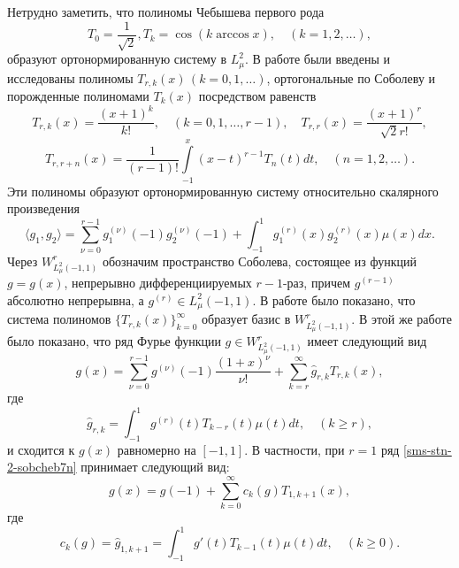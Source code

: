 Нетрудно заметить, что полиномы Чебышева первого рода
$$T_0=\frac{1}{\sqrt{2}},  T_k=\cos{(k\arccos x)}, \quad (k=1,2,\dots),$$
образуют ортонормированную систему в $L_\mu^2$.
В работе \cite{sms-stn-2-SharIzVuz} были введены и исследованы полиномы $T_{r,k}(x)\,(k=0,1,\ldots)$, ортогональные по Соболеву и порожденные полиномами $T_k(x)$ посредством  равенств
\begin{equation}\label{sms-stn-2-sobcheb1}
T_{r,k}(x) =\frac{(x+1)^k}{k!}, \quad (k=0,1,\ldots, r-1),
\quad
T_{r,r}(x) =\frac{(x+1)^r}{\sqrt{2}r!},
\end{equation}
\begin{equation}\label{sms-stn-2-sobcheb2}
T_{r,r+n}(x) =\frac{1}{(r-1)!}\int\limits_{-1}^x(x-t)^{r-1}T_{n}(t)dt, \quad (n=1,2,\ldots).
\end{equation}
Эти полиномы образуют ортонормированную систему относительно скалярного произведения
\begin{equation}\label{sms-stn-2-sobcheb3}
\langle g_1,g_2\rangle=\sum_{\nu=0}^{r-1}g_1^{(\nu)}(-1)g_2^{(\nu)}(-1)+\int_{-1}^{1}g_1^{(r)}(x)g_2^{(r)}(x)\mu(x)dx.
\end{equation}
Через $W^r_{L^2_\mu(-1,1)}$ обозначим пространство Соболева, состоящее  из  функций $g=g(x)$, непрерывно дифференциируемых $r-1$-раз, причем $g^{(r-1)}$ абсолютно непрерывна, а $g^{(r)}\in L^2_\mu(-1,1)$.
В работе \cite{sms-stn-2-SharIzVuz} было показано, что система полиномов $\{T_{r,k}(x)\}_{k=0}^\infty$ образует базис в $W^r_{L^2_\mu(-1,1)}$. В этой же работе было показано, что ряд Фурье функции $g\in W^r_{L^2_\mu(-1,1)}$ имеет следующий вид \cite{sms-stn-2-SharIzVuz}
\begin{equation}\label{sms-stn-2-sobcheb7n}
g(x)=\sum_{\nu=0}^{r-1}g^{(\nu)}(-1)\frac{(1+x)^\nu}{\nu!}+ \sum_{k=r}^\infty \hat g_{r,k}T_{r,k}(x),
\end{equation}
где
\begin{equation}\label{sms-stn-2-sobcheb8n}
\hat g_{r,k}=\int_{-1}^1 g^{(r)}(t)T_{k-r}(t)\mu(t)dt,\quad(k\ge r),
\end{equation}
и сходится к $g(x)$ равномерно на $[-1,1]$.
В частности, при $r=1$ ряд \eqref{sms-stn-2-sobcheb7n} принимает следующий вид:
\begin{equation}\label{sms-stn-2-sobcheb7}
g(x)= g(-1)+ \sum_{k=0}^\infty c_{k}(g)T_{1,k+1}(x),
\end{equation}
где
\begin{equation}\label{sms-stn-2-sobcheb8}
c_{k}(g)=\hat g_{1,k+1}=\int_{-1}^1 g'(t)T_{k-1}(t)\mu(t)dt,\quad(k\ge0).
\end{equation}

